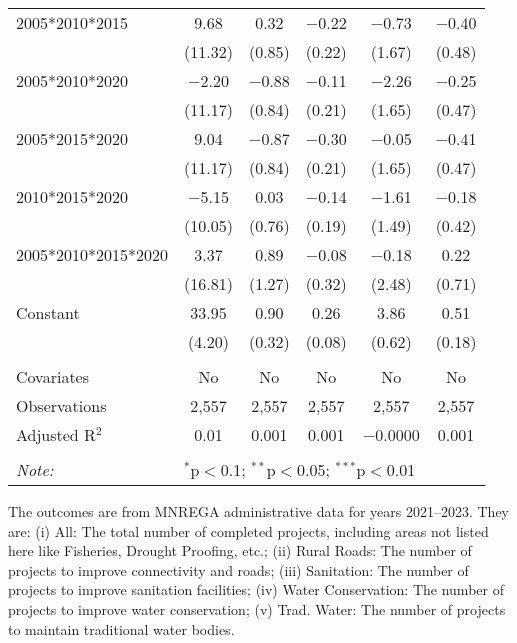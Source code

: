\begin{table}[!htbp]
\begin{threeparttable}
\begin{tabular}{@{\extracolsep{0pt}}lccccc}
  2005*2010*2015 & 9.68 & 0.32 & $-$0.22 & $-$0.73 & $-$0.40 \\ 
  & (11.32) & (0.85) & (0.22) & (1.67) & (0.48) \\ 
  2005*2010*2020 & $-$2.20 & $-$0.88 & $-$0.11 & $-$2.26 & $-$0.25 \\ 
  & (11.17) & (0.84) & (0.21) & (1.65) & (0.47) \\ 
  2005*2015*2020 & 9.04 & $-$0.87 & $-$0.30 & $-$0.05 & $-$0.41 \\ 
  & (11.17) & (0.84) & (0.21) & (1.65) & (0.47) \\ 
  2010*2015*2020 & $-$5.15 & 0.03 & $-$0.14 & $-$1.61 & $-$0.18 \\ 
  & (10.05) & (0.76) & (0.19) & (1.49) & (0.42) \\ 
  2005*2010*2015*2020 & 3.37 & 0.89 & $-$0.08 & $-$0.18 & 0.22 \\ 
  & (16.81) & (1.27) & (0.32) & (2.48) & (0.71) \\ 
  Constant & 33.95 & 0.90 & 0.26 & 3.86 & 0.51 \\ 
  & (4.20) & (0.32) & (0.08) & (0.62) & (0.18) \\ 
 \hline \\[-1.8ex] 
Covariates & No & No & No & No & No \\ 
Observations & 2,557 & 2,557 & 2,557 & 2,557 & 2,557 \\ 
Adjusted R$^{2}$ & 0.01 & 0.001 & 0.001 & $-$0.0000 & 0.001 \\ 
\hline 
\hline \\[-1.8ex] 
\textit{Note:}  & \multicolumn{5}{l}{$^{*}$p$<$0.1; $^{**}$p$<$0.05; $^{***}$p$<$0.01} \\ 
\end{tabular} 
\begin{tablenotes}[flushleft]
\scriptsize
\item The outcomes are from MNREGA administrative data for years 2021--2023. They are: 
(i) All: The total number of completed projects, including areas not listed here like Fisheries, Drought Proofing, etc.;
(ii) Rural Roads: The number of projects to improve connectivity and roads;
(iii) Sanitation: The number of projects to improve sanitation facilities;
(iv) Water Conservation: The number of projects to improve water conservation;
(v) Trad. Water: The number of projects to maintain traditional water bodies.
\end{tablenotes}
\end{threeparttable}
\end{table}
